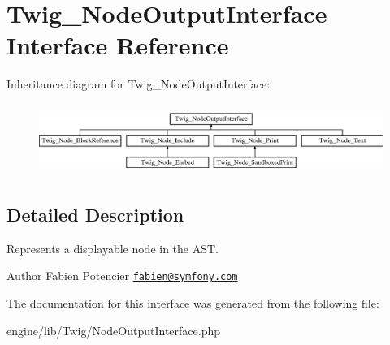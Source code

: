 \hypertarget{interface_twig___node_output_interface}{}\section{Twig\+\_\+\+Node\+Output\+Interface Interface Reference}
\label{interface_twig___node_output_interface}
Inheritance diagram for Twig\+\_\+\+Node\+Output\+Interface\+:\begin{figure}[H]
\begin{center}
\leavevmode
\includegraphics[height=2.333333cm]{interface_twig___node_output_interface}
\end{center}
\end{figure}


\subsection{Detailed Description}
Represents a displayable node in the A\+S\+T.

\begin{DoxyAuthor}{Author}
Fabien Potencier \href{mailto:fabien@symfony.com}{\tt fabien@symfony.\+com} 
\end{DoxyAuthor}


The documentation for this interface was generated from the following file\+:\begin{DoxyCompactItemize}
\item 
engine/lib/\+Twig/Node\+Output\+Interface.\+php\end{DoxyCompactItemize}
